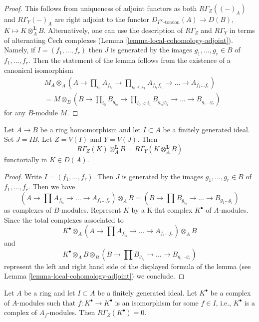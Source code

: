 \begin{proof}
This follows from uniqueness of adjoint functors as both
$R\Gamma_Z((-)_A)$ and $R\Gamma_Y(-)_A$
are right adjoint to the functor $D_{I^\infty\text{-torsion}}(A) \to D(B)$,
$K \mapsto K \otimes_A^\mathbf{L} B$.
Alternatively, one can use the description of $R\Gamma_Z$ and $R\Gamma_Y$
in terms of alternating {\v C}ech complexes
(Lemma \ref{lemma-local-cohomology-adjoint}).
Namely, if $I = (f_1, \ldots, f_r)$ then $J$ is generated by the images
$g_1, \ldots, g_r \in B$ of $f_1, \ldots, f_r$.
Then the statement of the lemma follows from the existence of
a canonical isomorphism
\begin{align*}
& M_A \otimes_A (A \to \prod\nolimits_{i_0} A_{f_{i_0}} \to
\prod\nolimits_{i_0 < i_1} A_{f_{i_0}f_{i_1}}
\to \ldots \to A_{f_1\ldots f_r}) \\
& = 
M \otimes_B (B \to \prod\nolimits_{i_0} B_{g_{i_0}} \to
\prod\nolimits_{i_0 < i_1} B_{g_{i_0}g_{i_1}}
\to \ldots \to B_{g_1\ldots g_r})
\end{align*}
for any $B$-module $M$.
\end{proof}

\begin{lemma}
\label{lemma-torsion-change-rings}
Let $A \to B$ be a ring homomorphism and let $I \subset A$
be a finitely generated ideal. Set $J = IB$. Let $Z = V(I)$ and $Y = V(J)$.
Then
$$
R\Gamma_Z(K) \otimes_A^\mathbf{L} B = R\Gamma_Y(K \otimes_A^\mathbf{L} B)
$$
functorially in $K \in D(A)$.
\end{lemma}

\begin{proof}
Write $I = (f_1, \ldots, f_r)$. Then $J$ is generated by the images
$g_1, \ldots, g_r \in B$ of $f_1, \ldots, f_r$. Then we have
$$
(A \to \prod A_{f_{i_0}} \to \ldots \to A_{f_1\ldots f_r}) \otimes_A B =
(B \to \prod B_{g_{i_0}} \to \ldots \to B_{g_1\ldots g_r})
$$
as complexes of $B$-modules. Represent $K$ by a K-flat complex $K^\bullet$
of $A$-modules. Since the total complexes associated to
$$
K^\bullet \otimes_A
(A \to \prod A_{f_{i_0}} \to \ldots \to A_{f_1\ldots f_r}) \otimes_A B
$$
and
$$
K^\bullet \otimes_A B \otimes_B
(B \to \prod B_{g_{i_0}} \to \ldots \to B_{g_1\ldots g_r})
$$
represent the left and right hand side of the displayed formula of the
lemma (see Lemma \ref{lemma-local-cohomology-adjoint}) we conclude.
\end{proof}

\begin{lemma}
\label{lemma-local-cohomology-vanishes}
Let $A$ be a ring and let $I \subset A$ be a finitely generated ideal.
Let $K^\bullet$ be a complex of $A$-modules such that
$f : K^\bullet \to K^\bullet$ is an isomorphism for some
$f \in I$, i.e., $K^\bullet$ is a complex of $A_f$-modules. Then
$R\Gamma_Z(K^\bullet) = 0$.
\end{lemma}


